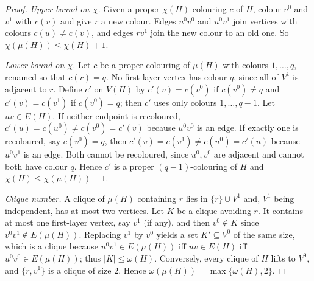 \documentclass[11pt,a4paper]{article}
\theoremstyle{plain}
\theoremstyle{definition}
\theoremstyle{remark}
\newcommand{\myc}{\mu}
\begin{document}
\label{pf:classic}
\lemclassic*
\begin{proof}
\emph{Upper bound on $\chi$.} Given a proper $\chi(H)$-colouring $c$ of $H$, colour $v^0$ and $v^1$ with $c(v)$ and give $r$ a new colour. Edges $u^0v^0$ and $u^0v^1$ join vertices with colours $c(u)\ne c(v)$, and edges $rv^1$ join the new colour to an old one. So $\chi(\myc(H))\le\chi(H)+1$.

\emph{Lower bound on $\chi$.} Let $c$ be a proper colouring of $\myc(H)$ with colours $1,\dots,q$, renamed so that $c(r)=q$. No first-layer vertex has colour $q$, since all of $V^1$ is adjacent to $r$. Define $c'$ on $V(H)$ by $c'(v)=c(v^0)$ if $c(v^0)\ne q$ and $c'(v)=c(v^1)$ if $c(v^0)=q$; then $c'$ uses only colours $1,\dots,q-1$. Let $uv\in E(H)$. If neither endpoint is recoloured, $c'(u)=c(u^0)\ne c(v^0)=c'(v)$ because $u^0v^0$ is an edge. If exactly one is recoloured, say $c(v^0)=q$, then $c'(v)=c(v^1)\ne c(u^0)=c'(u)$ because $u^0v^1$ is an edge. Both cannot be recoloured, since $u^0,v^0$ are adjacent and cannot both have colour $q$. Hence $c'$ is a proper $(q-1)$-colouring of $H$ and $\chi(H)\le\chi(\myc(H))-1$.

\emph{Clique number.} A clique of $\myc(H)$ containing $r$ lies in $\{r\}\cup V^1$ and, $V^1$ being independent, has at most two vertices. Let $K$ be a clique avoiding $r$. It contains at most one first-layer vertex, say $v^1$ (if any), and then $v^0\notin K$ since $v^0v^1\notin E(\myc(H))$. Replacing $v^1$ by $v^0$ yields a set $K'\subseteq V^0$ of the same size, which is a clique because $u^0v^1\in E(\myc(H))$ iff $uv\in E(H)$ iff $u^0v^0\in E(\myc(H))$; thus $|K|\le\omega(H)$. Conversely, every clique of $H$ lifts to $V^0$, and $\{r,v^1\}$ is a clique of size $2$. Hence $\omega(\myc(H))=\max\{\omega(H),2\}$.
\end{proof}
\end{document}
